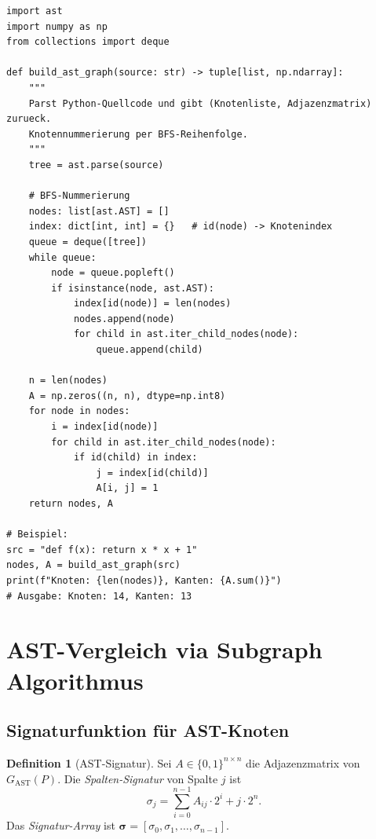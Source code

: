 ﻿\documentclass[a4paper,12pt]{article}
\theoremstyle{definition}
\newtheorem{definition}{Definition}
\begin{document}
\begin{lstlisting}[style=pystyle,
    caption={AST-Konstruktion und Konvertierung in Adjazenzmatrix}]
import ast
import numpy as np
from collections import deque

def build_ast_graph(source: str) -> tuple[list, np.ndarray]:
    """
    Parst Python-Quellcode und gibt (Knotenliste, Adjazenzmatrix) zurueck.
    Knotennummerierung per BFS-Reihenfolge.
    """
    tree = ast.parse(source)

    # BFS-Nummerierung
    nodes: list[ast.AST] = []
    index: dict[int, int] = {}   # id(node) -> Knotenindex
    queue = deque([tree])
    while queue:
        node = queue.popleft()
        if isinstance(node, ast.AST):
            index[id(node)] = len(nodes)
            nodes.append(node)
            for child in ast.iter_child_nodes(node):
                queue.append(child)

    n = len(nodes)
    A = np.zeros((n, n), dtype=np.int8)
    for node in nodes:
        i = index[id(node)]
        for child in ast.iter_child_nodes(node):
            if id(child) in index:
                j = index[id(child)]
                A[i, j] = 1
    return nodes, A

# Beispiel:
src = "def f(x): return x * x + 1"
nodes, A = build_ast_graph(src)
print(f"Knoten: {len(nodes)}, Kanten: {A.sum()}")
# Ausgabe: Knoten: 14, Kanten: 13
\end{lstlisting}

\section{AST-Vergleich via Subgraph Algorithmus}
\label{sec:vergl}

\subsection{Signaturfunktion f\"ur AST-Knoten}

\begin{definition}[AST-Signatur]
\label{def:sig}
Sei $A \in \{0,1\}^{n \times n}$ die Adjazenzmatrix von
$G_{\mathrm{AST}}(P)$.  Die \emph{Spalten-Signatur} von Spalte
$j$ ist
\[
\sigma_j = \sum_{i=0}^{n-1} A_{ij} \cdot 2^i + j \cdot 2^n.
\]
Das \emph{Signatur-Array} ist
$\boldsymbol{\sigma} = [\sigma_0, \sigma_1, \ldots, \sigma_{n-1}]$.
\end{definition}
\end{document}

